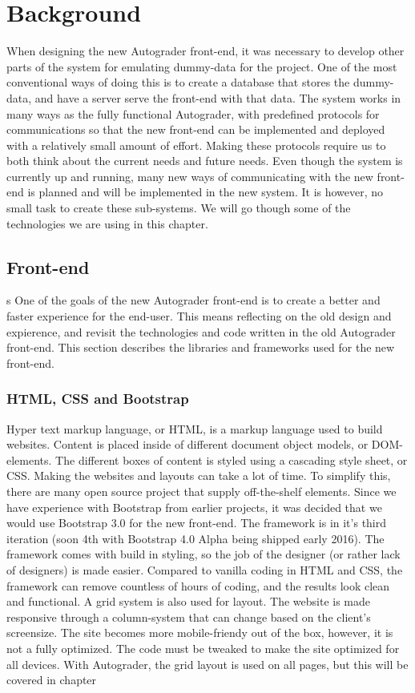 \chapter{Background}
When designing the new Autograder front-end, it was necessary to develop other parts of the system for emulating dummy-data for the project. One of the most conventional ways of doing this is to create a database that stores the dummy-data, and have a server serve the front-end with that data. The system works in many ways as the fully functional Autograder, with predefined protocols for communications so that the new front-end can be implemented and deployed with a relatively small amount of effort. Making these protocols require us to both think about the current needs and future needs. Even though the system is currently up and running, many new ways of communicating with the new front-end is planned and will be implemented in the new system. It is however, no small task to create these sub-systems. We will go though some of the technologies we are using in this chapter.

\section{Front-end}s
One of the goals of the new Autograder front-end is to create a better and faster experience for the end-user. This means reflecting on the old design and expierence, and revisit the technologies and code written in the old Autograder front-end. This section describes the libraries and frameworks used for the new front-end.

\subsection{HTML, CSS and Bootstrap}
Hyper text markup language, or HTML, is a markup language used to build websites. Content is placed inside of different document object models, or DOM-elements. The different boxes of content is styled using a cascading style sheet, or CSS. Making the websites and layouts can take a lot of time. To simplify this, there are many open source project that supply off-the-shelf elements. Since we have experience with Bootstrap from earlier projects, it was decided that we would use Bootstrap 3.0 for the new front-end. The framework is in it's third iteration (soon 4th with Bootstrap 4.0 Alpha being shipped early 2016). The framework comes with build in styling, so the job of the designer (or rather lack of designers) is made easier. Compared to vanilla coding in HTML and CSS, the framework can remove countless of hours of coding, and the results look clean and functional. A grid system is also used for layout. The website is made responsive through a column-system that can change based on the client's screensize. The site becomes more mobile-friendy out of the box, however, it is not a fully optimized. The code must be tweaked to make the site optimized for all devices. With Autograder, the grid layout is used on all pages, but this will be covered in chapter 

